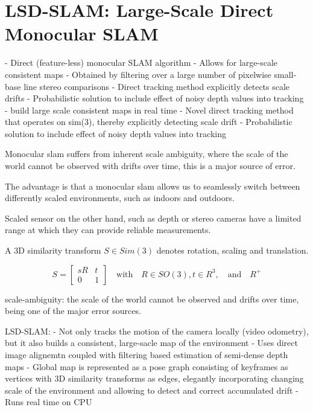 \section{LSD-SLAM: Large-Scale Direct Monocular SLAM}

- Direct (feature-less) monocular SLAM algorithm
- Allows for large-scale consistent maps
- Obtained by filtering over a large number of pixelwise small-base line stereo
  comparisons
- Direct tracking method explicitly detects scale drifts
- Probabilistic solution to include effect of noisy depth values into tracking
- build large scale consistent maps in real time
- Novel direct tracking method that operates on sim(3), thereby
explicitly detecting scale drift
- Probabilistic solution to include effect of noisy depth values into
tracking


Monocular slam suffers from inherent scale ambiguity, where the scale of the
world cannot be observed with drifts over time, this is a major source of
error.

The advantage is that a monocular slam allows us to seamlessly switch between
differently scaled environments, such as indoors and outdoors.

Scaled sensor on the other hand, such as depth or stereo cameras have a limited
range at which they can provide reliable measurements.

A 3D similarity transform $S \in Sim(3)$ denotes rotation, scaling and
translation.

\begin{equation}
  S = \begin{bmatrix}
    s R & t \\
    0 & 1
  \end{bmatrix}
  \quad \text{with} \quad
  R \in SO(3),
  t \in R^{3},
  \quad \text{and} \quad
  R^{+}
\end{equation}


scale-ambiguity: the scale of the world cannot be observed and drifts over
time, being one of the major error sources.


LSD-SLAM:
- Not only tracks the motion of the camera locally (video odometry), but it
  also builds a consistent, large-sacle map of the environment
- Uses direct image alignemtn coupled with filtering based estimation of
  semi-dense depth maps
- Global map is represented as a pose graph consisting of keyframes as vertices
  with 3D similarity transforms as edges, elegantly incorporating changing
  scale of the environment and allowing to detect and correct accumulated
  drift
- Runs real time on CPU

